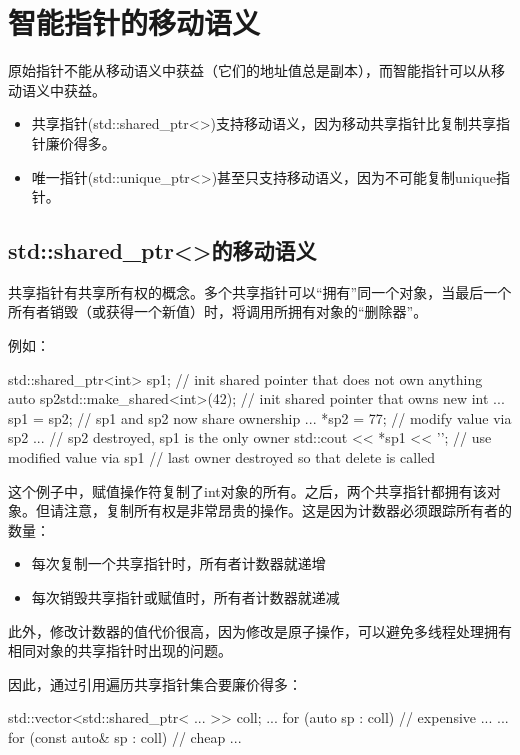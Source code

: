 \section{智能指针的移动语义}
原始指针不能从移动语义中获益（它们的地址值总是副本），而智能指针可以从移动语义中获益。

\begin{itemize}
	\item 共享指针(std::shared_ptr<>)支持移动语义，因为移动共享指针比复制共享指针廉价得多。
	\item 唯一指针(std::unique_ptr<>)甚至只支持移动语义，因为不可能复制unique指针。
\end{itemize}

\subsection{std::shared_ptr<>的移动语义}

共享指针有共享所有权的概念。多个共享指针可以“拥有”同一个对象，当最后一个所有者销毁（或获得一个新值）时，将调用所拥有对象的“删除器”。

例如：

\begin{cppcode}
{
	std::shared_ptr<int> sp1; // init shared pointer that does not own anything
	{
		auto sp2{std::make_shared<int>(42)}; // init shared pointer that owns new int
		...
		sp1 = sp2; // sp1 and sp2 now share ownership
		...
		*sp2 = 77; // modify value via sp2
		...
	} // sp2 destroyed, sp1 is the only owner
	std::cout << *sp1 << '\n'; // use modified value via sp1
} // last owner destroyed so that delete is called
\end{cppcode}

这个例子中，赋值操作符复制了int对象的所有。之后，两个共享指针都拥有该对象。但请注意，复制所有权是非常昂贵的操作。这是因为计数器必须跟踪所有者的数量：

\begin{itemize}
	\item 每次复制一个共享指针时，所有者计数器就递增
	\item 每次销毁共享指针或赋值时，所有者计数器就递减
\end{itemize}

此外，修改计数器的值代价很高，因为修改是原子操作，可以避免多线程处理拥有相同对象的共享指针时出现的问题。

因此，通过引用遍历共享指针集合要廉价得多：

\begin{cppcode}
std::vector<std::shared_ptr< ... >> coll;
...
for (auto sp : coll) { // expensive
	...
}
...
for (const auto& sp : coll) { // cheap
	...
}
\end{cppcode}

